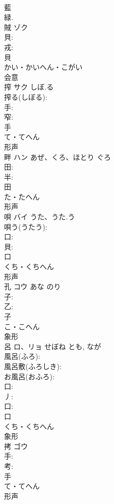 \documentclass[8pt]{extreport}
\begin{document}
\begin{CJK}{UTF8}{min}
\\	藍 
\\	緑. 
\\	賊	ゾク			
\\	貝: 
\\	戎: 
\\	貝	
\\	かい・かいへん・こがい	
\\	会意 
\\	搾	サク	しぼ.る		
\\	搾る(しぼる): 
\\	手: 
\\	窄: 
\\	手	
\\	て・てへん	
\\	形声 
\\	畔	ハン	あぜ、くろ、ほとり	ぐろ	
\\	田: 
\\	半: 
\\	田	
\\	た・たへん	
\\	形声 
\\	唄	バイ	うた、うた.う		
\\	唄う(うたう): 
\\	口: 
\\	貝: 
\\	口	
\\	くち・くちへん	
\\	形声 
\\	孔	コウ	あな	のり	
\\	子: 
\\	乙: 
\\	子	
\\	こ・こへん	
\\	象形 
\\	呂	ロ、リョ	せぼね	とも, なが	
\\	風呂(ふろ): 
\\	風呂敷(ふろしき): 
\\	お風呂(おふろ): 
\\	口: 
\\	丿: 
\\	口: 
\\	口	
\\	くち・くちへん	
\\	象形 
\\	拷	ゴウ			
\\	手: 
\\	考: 
\\	手	
\\	て・てへん	
\\	形声 

\end{CJK}
\end{document}
